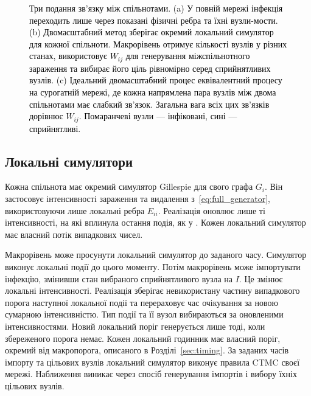 \begin{figure}[tbp]
\caption{\textcolor{black}{Три подання зв'язку між спільнотами. (a) У повній мережі інфекція переходить лише через показані фізичні ребра та їхні вузли-мости. (b) Двомасштабний метод зберігає окремий локальний симулятор для кожної спільноти. Макрорівень отримує кількості вузлів у різних станах, використовує $W_{ij}$ для генерування міжспільнотного зараження та вибирає його ціль рівномірно серед сприйнятливих вузлів. (c) Ідеальний двомасштабний процес еквівалентний процесу на сурогатній мережі, де кожна напрямлена пара вузлів між двома спільнотами має слабкий зв'язок. Загальна вага всіх цих зв'язків дорівнює $W_{ij}$. Помаранчеві вузли --- інфіковані, сині --- сприйнятливі.}}
\label{fig:schematic}
\end{figure}

\subsection{Локальні симулятори}
\label{sec:local}

Кожна спільнота має окремий симулятор Gillespie для свого графа $G_i$. Він застосовує інтенсивності зараження та видалення з~\eqref{eq:full_generator}, використовуючи лише локальні ребра $E_{ii}$. Реалізація оновлює лише ті інтенсивності, на які вплинула остання подія, як у \citet{kuryliak2025simulating}. Кожен локальний симулятор має власний потік випадкових чисел.

Макрорівень може просунути локальний симулятор до заданого часу. Симулятор виконує локальні події до цього моменту. Потім макрорівень може імпортувати інфекцію, змінивши стан вибраного сприйнятливого вузла на $I$. Це змінює локальні інтенсивності. Реалізація зберігає невикористану частину випадкового порога наступної локальної події та перераховує час очікування за новою сумарною інтенсивністю. Тип події та її вузол вибираються за оновленими інтенсивностями. Новий локальний поріг генерується лише тоді, коли збереженого порога немає. Кожен локальний годинник має власний поріг, окремий від макропорога, описаного в Розділі~\ref{sec:timing}. За заданих часів імпорту та цільових вузлів локальний симулятор виконує правила CTMC своєї мережі. Наближення виникає через спосіб генерування імпортів і вибору їхніх цільових вузлів.

